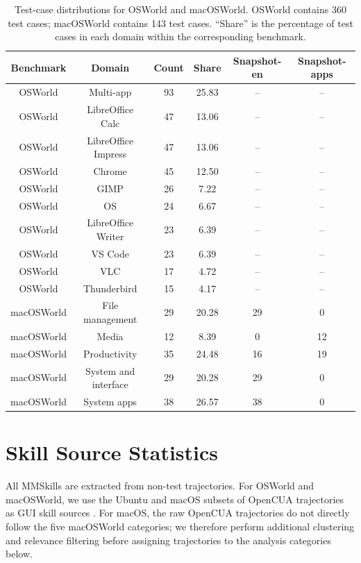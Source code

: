 \documentclass{llmxive}
\begin{document}
\begin{table}[!htbp]
\centering
\small
\setlength{\tabcolsep}{5pt}
\begin{tabular}{cccccc}
\toprule
Benchmark & Domain & Count & Share & Snapshot-en & Snapshot-apps \\
\midrule
OSWorld & Multi-app & 93 & 25.83 & -- & -- \\
OSWorld & LibreOffice Calc & 47 & 13.06 & -- & -- \\
OSWorld & LibreOffice Impress & 47 & 13.06 & -- & -- \\
OSWorld & Chrome & 45 & 12.50 & -- & -- \\
OSWorld & GIMP & 26 & 7.22 & -- & -- \\
OSWorld & OS & 24 & 6.67 & -- & -- \\
OSWorld & LibreOffice Writer & 23 & 6.39 & -- & -- \\
OSWorld & VS Code & 23 & 6.39 & -- & -- \\
OSWorld & VLC & 17 & 4.72 & -- & -- \\
OSWorld & Thunderbird & 15 & 4.17 & -- & -- \\
\midrule
macOSWorld & File management & 29 & 20.28 & 29 & 0 \\
macOSWorld & Media & 12 & 8.39 & 0 & 12 \\
macOSWorld & Productivity & 35 & 24.48 & 16 & 19 \\
macOSWorld & System and interface & 29 & 20.28 & 29 & 0 \\
macOSWorld & System apps & 38 & 26.57 & 38 & 0 \\
\bottomrule
\end{tabular}
\caption{Test-case distributions for OSWorld and macOSWorld. OSWorld contains 360 test cases; macOSWorld contains 143 test cases. ``Share'' is the percentage of test cases in each domain within the corresponding benchmark.}
\label{tab:desktop-test-distribution}
\end{table}

\section{Skill Source Statistics}
\label{app:skill-source-statistics}

All MMSkills are extracted from non-test trajectories. For OSWorld and macOSWorld, we use the Ubuntu and macOS subsets of OpenCUA trajectories as GUI skill sources \citep{wang2025opencuaopenfoundationscomputeruse}. For macOS, the raw OpenCUA trajectories do not directly follow the five macOSWorld categories; we therefore perform additional clustering and relevance filtering before assigning trajectories to the analysis categories below.
\end{document}
